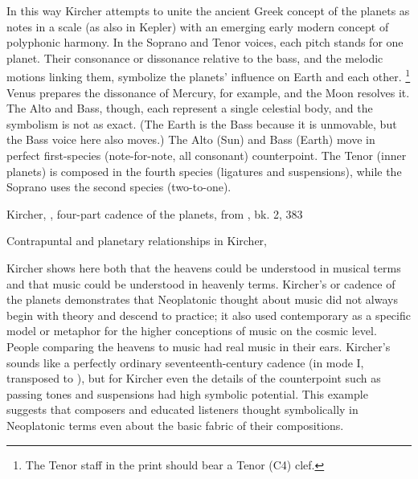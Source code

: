 In this way Kircher attempts to unite the ancient Greek concept of the planets
as notes in a scale (as also in Kepler) with an emerging early modern concept of
polyphonic harmony.
In the Soprano and Tenor voices, each pitch stands for one planet.
Their consonance or dissonance relative to the bass, and the melodic motions
linking them, symbolize the planets' influence on Earth and each other.%
    \footnote{The Tenor staff in the print should bear a Tenor (C4) clef.}
Venus prepares the dissonance of Mercury, for example, and the Moon resolves it.
The Alto and Bass, though, each represent a single celestial body, and the
symbolism is not as exact.
(The Earth is the Bass because it is unmovable, but the Bass voice here also
moves.)
The Alto (Sun) and Bass (Earth) move in perfect first-species (note-for-note,
all consonant) counterpoint.
The Tenor (inner planets) is composed in the fourth species (ligatures and
suspensions), while the Soprano uses the second species (two-to-one).


\begin{musicexample}
    \caption{Kircher, , four-part cadence of the planets, from , bk. 2, 383}
    \label{mus:Kircher-Tetraphonium_coeleste}
\end{musicexample}

\begin{table}
    \caption{Contrapuntal and planetary relationships in Kircher,
    }
    \label{tab:kircher-tetraphonium_coeleste-cpt}
\end{table}

Kircher shows here both that the heavens could be understood in musical terms
and that music could be understood in heavenly terms.
Kircher's  or cadence of the planets demonstrates that
Neoplatonic thought about music did not always begin with theory and descend to
practice; it also used contemporary  as a specific
model or metaphor for the higher conceptions of music on the cosmic level. 
People comparing the heavens to music had real music in their ears.
Kircher's  sounds like a perfectly ordinary seventeenth-century
cadence (in mode I, transposed to ), but for Kircher even
the  details of the counterpoint such as passing tones and
suspensions had high symbolic potential.
This example suggests that composers and educated listeners thought symbolically
in Neoplatonic terms even about the basic fabric of their compositions.

